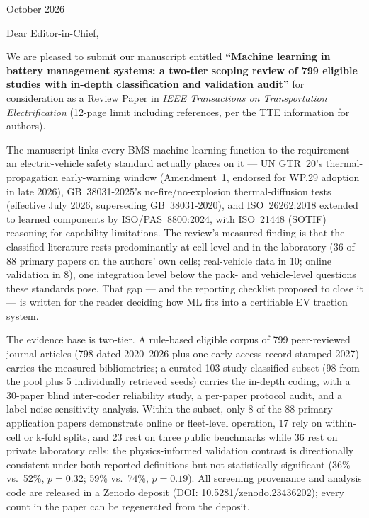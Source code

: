 \documentclass[11pt]{article}
\begin{document}
\noindent
October 2026

\vspace{10pt}
\noindent
Dear Editor-in-Chief,

\vspace{6pt}
We are pleased to submit our manuscript entitled \textbf{``Machine learning in battery management systems: a two-tier scoping review of 799 eligible studies with in-depth classification and validation audit''} for consideration as a Review Paper in \textit{IEEE Transactions on Transportation Electrification} (12-page limit including references, per the TTE information for authors).

\vspace{6pt}
The manuscript links every BMS machine-learning function to the requirement an electric-vehicle safety standard actually places on it --- UN GTR~20's thermal-propagation early-warning window (Amendment~1, endorsed for WP.29 adoption in late 2026), GB~38031-2025's no-fire/no-explosion thermal-diffusion tests (effective July 2026, superseding GB~38031-2020), and ISO~26262:2018 extended to learned components by ISO/PAS~8800:2024, with ISO~21448 (SOTIF) reasoning for capability limitations. The review's measured finding is that the classified literature rests predominantly at cell level and in the laboratory (36 of 88 primary papers on the authors' own cells; real-vehicle data in 10; online validation in 8), one integration level below the pack- and vehicle-level questions these standards pose. That gap --- and the reporting checklist proposed to close it --- is written for the reader deciding how ML fits into a certifiable EV traction system.

\vspace{6pt}
The evidence base is two-tier. A rule-based eligible corpus of 799 peer-reviewed journal articles (798 dated 2020--2026 plus one early-access record stamped 2027) carries the measured bibliometrics; a curated 103-study classified subset (98 from the pool plus 5 individually retrieved seeds) carries the in-depth coding, with a 30-paper blind inter-coder reliability study, a per-paper protocol audit, and a label-noise sensitivity analysis. Within the subset, only 8 of the 88 primary-application papers demonstrate online or fleet-level operation, 17 rely on within-cell or k-fold splits, and 23 rest on three public benchmarks while 36 rest on private laboratory cells; the physics-informed validation contrast is directionally consistent under both reported definitions but not statistically significant (36\% vs.\ 52\%, $p=0.32$; 59\% vs.\ 74\%, $p=0.19$). All screening provenance and analysis code are released in a Zenodo deposit (DOI: 10.5281/zenodo.23436202); every count in the paper can be regenerated from the deposit.
\end{document}
